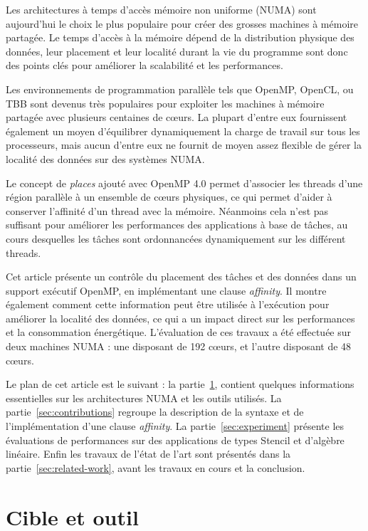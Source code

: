 \documentclass[parallelisme]{compas2017}
\begin{document}
Les architectures à temps d'accès mémoire non uniforme (NUMA) sont
aujourd'hui le choix le plus populaire pour créer des grosses machines à mémoire
partagée. Le temps d'accès à la mémoire dépend de la distribution physique des
données, leur placement et leur localité durant la vie du programme sont
donc des points clés pour améliorer la scalabilité et les performances.

Les environnements de programmation parallèle tels que OpenMP, OpenCL, ou TBB sont devenus très
populaires pour exploiter les machines à mémoire partagée avec plusieurs centaines de cœurs.
La plupart d'entre eux fournissent également
un moyen d'équilibrer dynamiquement la charge de travail sur tous les processeurs,
mais aucun d'entre eux ne fournit de moyen assez flexible de gérer la localité
des données sur des systèmes NUMA.

Le concept de \emph{places} ajouté avec OpenMP 4.0 permet d'associer les threads
d'une région parallèle à un ensemble
de cœurs physiques, ce qui permet d'aider à conserver l'affinité d'un thread avec la mémoire.
Néanmoins cela n'est pas suffisant pour améliorer les performances des applications
à base de tâches, au cours desquelles les tâches sont ordonnancées dynamiquement sur les différent threads.

Cet article présente un contrôle du placement des tâches et des données
dans un support exécutif OpenMP, en implémentant une clause \emph{affinity}.
Il montre également comment cette information peut être utilisée à l'exécution pour
améliorer la localité des données, ce qui a un impact direct sur les performances
et la consommation énergétique.
L'évaluation de ces travaux a été effectuée sur deux machines NUMA : une disposant de 192
cœurs, et l'autre disposant de 48 cœurs.

Le plan de cet article est le suivant :
la partie~\ref{sec:background},
contient quelques informations essentielles sur les architectures NUMA et
les outils utilisés.
La partie~\ref{sec:contributions} regroupe la description de la syntaxe
et de l'implémentation d'une clause \emph{affinity}.
La partie~\ref{sec:experiment}
présente les évaluations de performances sur des applications de types Stencil
et d'algèbre linéaire.
Enfin les travaux de l'état
de l'art sont présentés dans la partie~\ref{sec:related-work}, avant les travaux
en cours et la conclusion.


\section{Cible et outil}
\label{sec:background}
\end{document}
